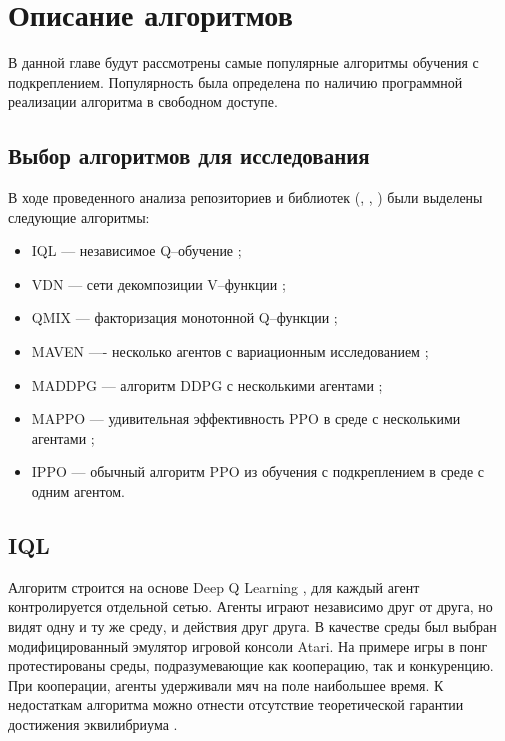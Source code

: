 \chapter{Описание алгоритмов}

В данной главе будут рассмотрены самые популярные алгоритмы обучения с подкреплением.
Популярность была определена по наличию программной реализации алгоритма в свободном доступе.

\section{Выбор алгоритмов для исследования}

В ходе проведенного анализа репозиториев и библиотек (\cite{samvelyan19smac}, \cite{MARL-ALGORIGHMS}, \cite{Awesome-MARL}) были выделены следующие алгоритмы:

\begin{itemize}[label=---]
	\item IQL --- независимое Q--обучение \cite{DBLP:journals/corr/TampuuMKKKAAV15};
	\item VDN --- сети декомпозиции V--функции \cite{DBLP:journals/corr/SunehagLGCZJLSL17};
	\item QMIX --- факторизация монотонной Q--функции \cite{DBLP:journals/corr/abs-1803-11485};
	\item MAVEN ---- несколько агентов с вариационным исследованием \cite{DBLP:journals/corr/abs-1910-07483};
	\item MADDPG --- алгоритм DDPG \cite{https://doi.org/10.48550/arxiv.1509.02971} с несколькими агентами \cite{lowe2017multi};
	\item MAPPO --- удивительная эффективность PPO \cite{DBLP:journals/corr/SchulmanWDRK17} в среде с несколькими агентами \cite{DBLP:journals/corr/abs-2103-01955};
	\item IPPO --- обычный алгоритм PPO из обучения с подкреплением в среде с одним агентом.
\end{itemize}

\section{IQL}

Алгоритм строится на основе Deep Q Learning \cite{Mnih2013PlayingAW}, для каждый агент контролируется отдельной сетью.
Агенты играют независимо друг от друга, но видят одну и ту же среду, и действия друг друга.
В качестве среды был выбран модифицированный эмулятор игровой консоли Atari. 
На примере игры в понг протестированы среды, подразумевающие как кооперацию, так и конкуренцию. При кооперации, агенты удерживали мяч на поле наибольшее время.
К недостаткам алгоритма можно отнести отсутствие теоретической гарантии достижения эквилибриума \cite{DBLP:journals/corr/abs-2011-00583}. 

